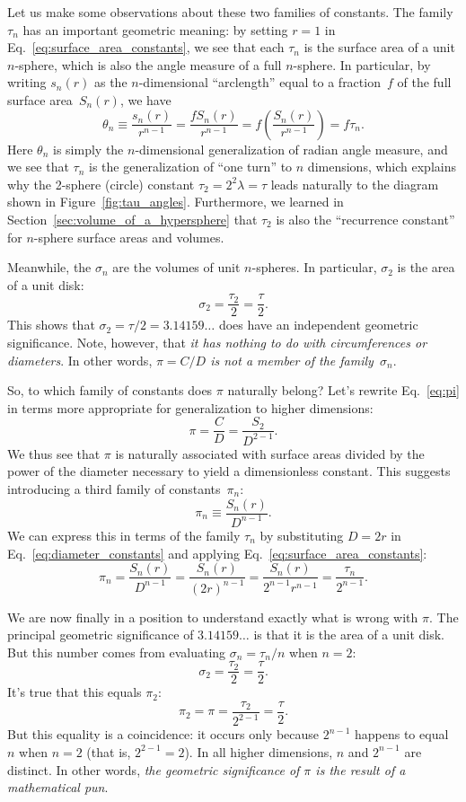 Let us make some observations about these two families of constants. The family $\tau_n$ has an important geometric meaning: by setting $r=1$ in Eq.~\eqref{eq:surface_area_constants}, we see that each $\tau_n$ is the surface area of a unit $n$-sphere, which is also the angle measure of a full $n$-sphere. In particular, by writing $s_n(r)$ as the $n$-dimensional ``arclength'' equal to a fraction~$f$ of the full surface area~$S_n(r)$, we have
\[
\theta_n \equiv \frac{s_n(r)}{r^{n-1}} = \frac{f S_n(r)}{r^{n-1}} = f\left(\frac{S_n(r)}{r^{n-1}}\right) = f\tau_n.
\]
Here $\theta_n$ is simply the $n$-dimensional generalization of radian angle measure, and we see that $\tau_n$ is the generalization of ``one turn'' to $n$ dimensions, which explains why the 2-sphere (circle) constant $\tau_2 = 2^2\lambda = \tau$ leads naturally to the diagram shown in Figure~\ref{fig:tau_angles}. Furthermore, we learned in Section~\ref{sec:volume_of_a_hypersphere} that $\tau_2$ is also the ``recurrence constant'' for $n$-sphere surface areas and volumes.

Meanwhile, the $\sigma_n$ are the volumes of unit $n$-spheres. In particular, $\sigma_2$ is the area of a unit disk:
\[
\sigma_2 = \frac{\tau_2}{2} = \frac{\tau}{2}.
\]
This shows that $\sigma_2 = \tau/2 = 3.14159\ldots$ does have an independent geometric significance. Note, however, that \emph{it has nothing to do with circumferences or diameters}. In other words, \emph{$\pi = C/D$ is not a member of the family~$\sigma_n$}.

So, to which family of constants does $\pi$ naturally belong?
Let's rewrite Eq.~\eqref{eq:pi} in terms more appropriate for generalization to higher dimensions:
\[
\pi = \frac{C}{D} = \frac{S_2}{D^{2-1}}.
\]
We thus see that $\pi$ is naturally associated with surface areas divided by the power of the diameter necessary to yield a dimensionless constant. This suggests introducing a third family of constants~$\pi_n$:
\begin{equation}
\label{eq:diameter_constants}
\pi_n \equiv \frac{S_n(r)}{D^{n-1}}.
\end{equation}
We can express this in terms of the family $\tau_n$ by substituting $D = 2r$ in Eq.~\eqref{eq:diameter_constants} and applying Eq.~\eqref{eq:surface_area_constants}:
\[
\pi_n = \frac{S_n(r)}{D^{n-1}} = \frac{S_n(r)}{(2r)^{n-1}} =
\frac{S_n(r)}{2^{n-1}r^{n-1}} = \frac{\tau_n}{2^{n-1}}.
\]

We are now finally in a position to understand exactly what is wrong with $\pi$. The principal geometric significance of $3.14159\ldots$ is that it is the area of a unit disk. But this number comes from evaluating $\sigma_n = \tau_n/n$ when $n=2$:
\[
\sigma_2 = \frac{\tau_2}{2} = \frac{\tau}{2}.
\]
It's true that this equals $\pi_2$:
\[
\pi_2 = \pi = \frac{\tau_2}{2^{2-1}} = \frac{\tau}{2}.
\]
But this equality is a coincidence: it occurs only because $2^{n-1}$ happens to equal $n$ when $n=2$ (that is, $2^{2-1} = 2$). In all higher dimensions, $n$ and $2^{n-1}$ are distinct. In other words, \emph{the geometric significance of $\pi$ is the result of a mathematical pun}.

